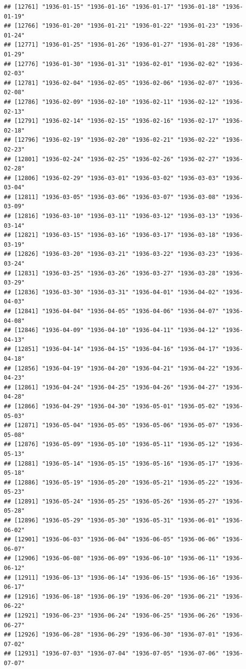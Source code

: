 \documentclass{article}\usepackage[]{graphicx}\usepackage[]{color}
\makeatletter
\newenvironment{kframe}{%
 \def\at@end@of@kframe{}%
 \ifinner\ifhmode%
  \def\at@end@of@kframe{\end{minipage}}%
  \begin{minipage}{\columnwidth}%
 \fi\fi%
 \def\FrameCommand##1{\hskip\@totalleftmargin \hskip-\fboxsep
 \colorbox{shadecolor}{##1}\hskip-\fboxsep
     \hskip-\linewidth \hskip-\@totalleftmargin \hskip\columnwidth}%
 \MakeFramed {\advance\hsize-\width
   \@totalleftmargin\z@ \linewidth\hsize
   \@setminipage}}%
 {\par\unskip\endMakeFramed%
 \at@end@of@kframe}
\newenvironment{knitrout}{}{} %
\makeatother
\begin{document}
\begin{description}
\begin{knitrout}
\begin{kframe}
\begin{verbatim}
## [12761] "1936-01-15" "1936-01-16" "1936-01-17" "1936-01-18" "1936-01-19"
## [12766] "1936-01-20" "1936-01-21" "1936-01-22" "1936-01-23" "1936-01-24"
## [12771] "1936-01-25" "1936-01-26" "1936-01-27" "1936-01-28" "1936-01-29"
## [12776] "1936-01-30" "1936-01-31" "1936-02-01" "1936-02-02" "1936-02-03"
## [12781] "1936-02-04" "1936-02-05" "1936-02-06" "1936-02-07" "1936-02-08"
## [12786] "1936-02-09" "1936-02-10" "1936-02-11" "1936-02-12" "1936-02-13"
## [12791] "1936-02-14" "1936-02-15" "1936-02-16" "1936-02-17" "1936-02-18"
## [12796] "1936-02-19" "1936-02-20" "1936-02-21" "1936-02-22" "1936-02-23"
## [12801] "1936-02-24" "1936-02-25" "1936-02-26" "1936-02-27" "1936-02-28"
## [12806] "1936-02-29" "1936-03-01" "1936-03-02" "1936-03-03" "1936-03-04"
## [12811] "1936-03-05" "1936-03-06" "1936-03-07" "1936-03-08" "1936-03-09"
## [12816] "1936-03-10" "1936-03-11" "1936-03-12" "1936-03-13" "1936-03-14"
## [12821] "1936-03-15" "1936-03-16" "1936-03-17" "1936-03-18" "1936-03-19"
## [12826] "1936-03-20" "1936-03-21" "1936-03-22" "1936-03-23" "1936-03-24"
## [12831] "1936-03-25" "1936-03-26" "1936-03-27" "1936-03-28" "1936-03-29"
## [12836] "1936-03-30" "1936-03-31" "1936-04-01" "1936-04-02" "1936-04-03"
## [12841] "1936-04-04" "1936-04-05" "1936-04-06" "1936-04-07" "1936-04-08"
## [12846] "1936-04-09" "1936-04-10" "1936-04-11" "1936-04-12" "1936-04-13"
## [12851] "1936-04-14" "1936-04-15" "1936-04-16" "1936-04-17" "1936-04-18"
## [12856] "1936-04-19" "1936-04-20" "1936-04-21" "1936-04-22" "1936-04-23"
## [12861] "1936-04-24" "1936-04-25" "1936-04-26" "1936-04-27" "1936-04-28"
## [12866] "1936-04-29" "1936-04-30" "1936-05-01" "1936-05-02" "1936-05-03"
## [12871] "1936-05-04" "1936-05-05" "1936-05-06" "1936-05-07" "1936-05-08"
## [12876] "1936-05-09" "1936-05-10" "1936-05-11" "1936-05-12" "1936-05-13"
## [12881] "1936-05-14" "1936-05-15" "1936-05-16" "1936-05-17" "1936-05-18"
## [12886] "1936-05-19" "1936-05-20" "1936-05-21" "1936-05-22" "1936-05-23"
## [12891] "1936-05-24" "1936-05-25" "1936-05-26" "1936-05-27" "1936-05-28"
## [12896] "1936-05-29" "1936-05-30" "1936-05-31" "1936-06-01" "1936-06-02"
## [12901] "1936-06-03" "1936-06-04" "1936-06-05" "1936-06-06" "1936-06-07"
## [12906] "1936-06-08" "1936-06-09" "1936-06-10" "1936-06-11" "1936-06-12"
## [12911] "1936-06-13" "1936-06-14" "1936-06-15" "1936-06-16" "1936-06-17"
## [12916] "1936-06-18" "1936-06-19" "1936-06-20" "1936-06-21" "1936-06-22"
## [12921] "1936-06-23" "1936-06-24" "1936-06-25" "1936-06-26" "1936-06-27"
## [12926] "1936-06-28" "1936-06-29" "1936-06-30" "1936-07-01" "1936-07-02"
## [12931] "1936-07-03" "1936-07-04" "1936-07-05" "1936-07-06" "1936-07-07"

\end{verbatim}
\end{kframe}
\end{knitrout}
\end{description}
\end{document}
